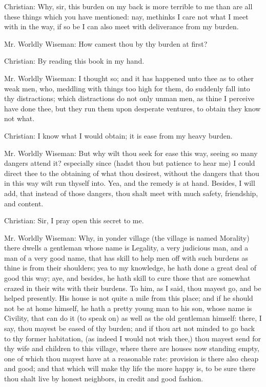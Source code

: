 Christian: Why, sir, this burden on my back is more terrible to me than are all these things which you have mentioned: nay, methinks I care not what I meet with in the way, if so be I can also meet with deliverance from my burden. 

Mr. Worldly Wiseman: How camest thou by thy burden at first? 

Christian: By reading this book in my hand. 

Mr. Worldly Wiseman: I thought so; and it has happened unto thee as to other weak men, who, meddling with things too high for them, do suddenly fall into thy distractions; which distractions do not only unman men, as thine I perceive have done thee, but they run them upon desperate ventures, to obtain they know not what. 

Christian: I know what I would obtain; it is ease from my heavy burden. 

Mr. Worldly Wiseman: But why wilt thou seek for ease this way, seeing so many dangers attend it? especially since (hadst thou but patience to hear me) I could direct thee to the obtaining of what thou desirest, without the dangers that thou in this way wilt run thyself into. Yea, and the remedy is at hand. Besides, I will add, that instead of those dangers, thou shalt meet with much safety, friendship, and content. 

Christian: Sir, I pray open this secret to me. 

Mr. Worldly Wiseman: Why, in yonder village (the village is named Morality) there dwells a gentleman whose name is Legality, a very judicious man, and a man of a very good name, that has skill to help men off with such burdens as thine is from their shoulders; yea to my knowledge, he hath done a great deal of good this way; aye, and besides, he hath skill to cure those that are somewhat crazed in their wits with their burdens. To him, as I said, thou mayest go, and be helped presently. His house is not quite a mile from this place; and if he should not be at home himself, he hath a pretty young man to his son, whose name is Civility, that can do it (to speak on) as well as the old gentleman himself: there, I say, thou mayest be eased of thy burden; and if thou art not minded to go back to thy former habitation, (as indeed I would not wish thee,) thou mayest send for thy wife and children to this village, where there are houses now standing empty, one of which thou mayest have at a reasonable rate: provision is there also cheap and good; and that which will make thy life the more happy is, to be sure there thou shalt live by honest neighbors, in credit and good fashion. 

